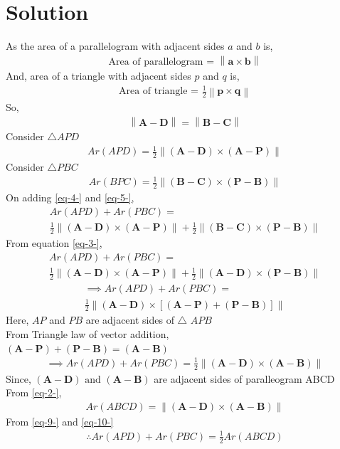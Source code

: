 \documentclass{article}
\providecommand{\norm}[1]{\left\lVert#1\right\rVert}
\let\vec\mathbf
\begin{document}
\section{Solution}
As the area of a parallelogram with adjacent sides $a$ and $b$ is,
\begin{align}
\text{Area of parallelogram = } \norm{\vec{a} \times \vec{b}}
\label{eq-1-}
\end{align}
And, area of a triangle with adjacent sides $p$ and $q$ is,
\begin{align}
\text{Area of triangle = } \frac{1}{2} \norm{\vec{p} \times \vec{q}}
\label{eq-2-}
\end{align}
So,
\begin{align}
\norm{\vec{A-D}} = \norm{\vec{B-C}}
\label{eq-3-}
\end{align}
Consider $\triangle APD$
\begin{align}
Ar(APD) = \frac{1}{2}\norm{\vec{(A-D)} \times \vec{(A-P)}}
\label{eq-4-}
\end{align}
Consider $\triangle PBC$
\begin{align}
Ar(BPC) =  \frac{1}{2}\norm{\vec{(B-C)} \times \vec{(P-B)}}
\label{eq-5-}
\end{align}
On adding \eqref{eq-4-} and \eqref{eq-5-},
\begin{multline}
Ar(APD) + Ar(PBC) =\\
 \frac{1}{2}\norm{\vec{(A-D)} \times \vec{(A-P)}} + \frac{1}{2}\norm{\vec{(B-C)} \times \vec{(P-B)}}
\label{eq-6-}
\end{multline}
From equation \eqref{eq-3-},
\begin{multline}
Ar(APD) + Ar(PBC) =\\
 \frac{1}{2}\norm{\vec{(A-D)} \times \vec{(A-P)}} + \frac{1}{2}\norm{\vec{(A-D)} \times \vec{(P-B)}}
\label{eq-7-}
\end{multline}
\begin{multline}
\implies Ar(APD) + Ar(PBC) =\\ \frac{1}{2}\norm{\vec{(A-D)}\times[\vec{(A-P)} + \vec{(P-B)}]}
\label{eq-8-}
\end{multline}
Here, $AP$ and $PB$ are adjacent sides of $\triangle$ $APB$
\\From Triangle law of vector addition, \\ $\vec{(A-P)} + \vec{(P-B)} = \vec{(A-B)}$
\begin{align}
\implies Ar(APD) + Ar(PBC) = \frac{1}{2}\norm{\vec{(A-D)}\times\vec{(A-B)}}
\label{eq-9-}
\end{align}
Since, $\vec{(A-D)} \text{ and }\vec{(A-B)}$ are adjacent sides of paralleogram ABCD
\\From \eqref{eq-2-},
\begin{align}
Ar(ABCD) = \norm{\vec{(A-D)}\times\vec{(A-B)}}
\label{eq-10-}
\end{align}
From \eqref{eq-9-} and \eqref{eq-10-}
\begin{align}
\therefore  Ar(APD)+Ar(PBC) = \frac{1}{2}Ar(ABCD)
\label{eq-11-}
\end{align}
\end{document}
